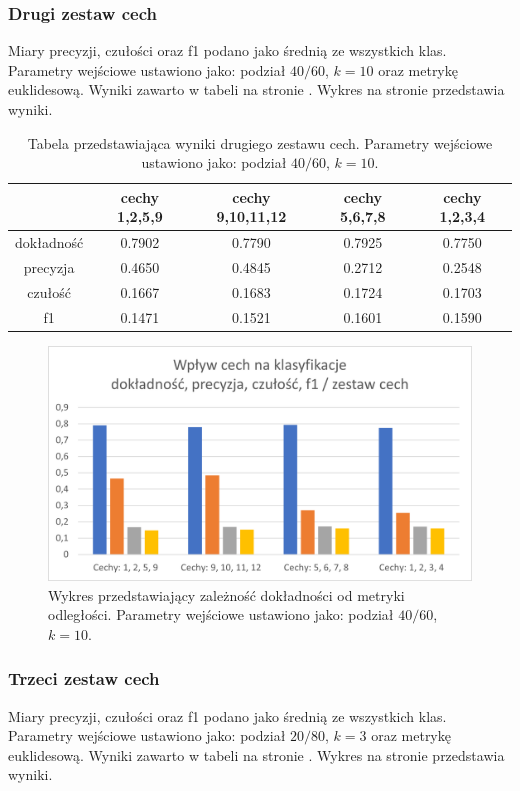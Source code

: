 \documentclass{classrep}
\begin{document}
\subsubsection{Drugi zestaw cech}
Miary precyzji, czułości oraz f1 podano jako średnią ze wszystkich klas. Parametry wejściowe ustawiono jako: podział $40/60$, $k=10$ oraz metrykę euklidesową. Wyniki zawarto w tabeli na stronie \pageref{tf2}. Wykres na stronie \pageref{features_set_2} przedstawia wyniki.


\begin{table}
\label{tf2}
\begin{tabular}{|c|c|c|c|c|}
\hline  & cechy 1,2,5,9 & cechy 9,10,11,12 & cechy 5,6,7,8 & cechy 1,2,3,4 \\
\hline \hline
dokładność & 0.7902 & 0.7790 & 0.7925 & 0.7750\\
precyzja & 0.4650 & 0.4845 & 0.2712 & 0.2548 \\
czułość & 0.1667 & 0.1683 & 0.1724 & 0.1703\\
f1 & 0.1471 & 0.1521 & 0.1601 & 0.1590 \\
\end{tabular}
\caption{Tabela przedstawiająca wyniki drugiego zestawu cech. Parametry wejściowe ustawiono jako: podział $40/60$, $k=10$.}
\end{table}

\begin{figure}
\label{features_set_2}
\includegraphics[scale=1]{features_set_2}
\caption{Wykres przedstawiający zależność dokładności od metryki odległości. Parametry wejściowe ustawiono jako: podział $40/60$, $k=10$.}
\end{figure}


\subsubsection{Trzeci zestaw cech}
Miary precyzji, czułości oraz f1 podano jako średnią ze wszystkich klas. Parametry wejściowe ustawiono jako: podział $20/80$, $k=3$ oraz metrykę euklidesową. Wyniki zawarto w tabeli na stronie \pageref{tf3}. Wykres na stronie \pageref{features_set_3} przedstawia wyniki.
\end{document}
